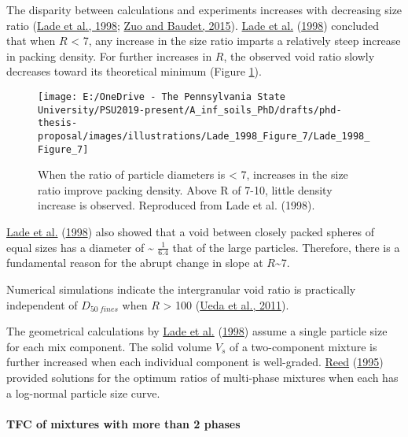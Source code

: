 \documentclass[
  letterpaper,
  openany]{book}
\begin{document}
The disparity between calculations and experiments increases with decreasing size ratio (\protect\hyperlink{ref-Lade1998}{Lade et al., 1998}; \protect\hyperlink{ref-Zuo2015}{Zuo and Baudet, 2015}).
\protect\hyperlink{ref-Lade1998}{Lade et al.} (\protect\hyperlink{ref-Lade1998}{1998}) concluded that when \(R\) \textless{} 7, any increase in the size ratio imparts a relatively steep increase in packing density.
For further increases in \(R\), the observed void ratio slowly decreases toward its theoretical minimum (Figure \ref{fig:lade-1998-figure-7}).

\begin{figure}

{\centering \texttt{[image: E:/OneDrive - The Pennsylvania State University/PSU2019-present/A\_inf\_soils\_PhD/drafts/phd-thesis-proposal/images/illustrations/Lade\_1998\_Figure\_7/Lade\_1998\_Figure\_7]} 

}

\caption[Importance of particle diameter ratio for intergranular packing]{When the ratio of particle diameters is < 7, increases in the size ratio improve packing density. Above R of 7-10, little density increase is observed. Reproduced from Lade et al. (1998).}\label{fig:lade-1998-figure-7}
\end{figure}

\protect\hyperlink{ref-Lade1998}{Lade et al.} (\protect\hyperlink{ref-Lade1998}{1998}) also showed that a void between closely packed spheres of equal sizes has a diameter of \textasciitilde{} \(\frac{1}{6.4}\) that of the large particles.
Therefore, there is a fundamental reason for the abrupt change in slope at \(R\)\textasciitilde7.

Numerical simulations indicate the intergranular void ratio is practically independent of \(D_{50~fines}\) when \(R\) \textgreater{} 100 (\protect\hyperlink{ref-Ueda2011}{Ueda et al., 2011}).

The geometrical calculations by \protect\hyperlink{ref-Lade1998}{Lade et al.} (\protect\hyperlink{ref-Lade1998}{1998}) assume a single particle size for each mix component.
The solid volume \(V_s\) of a two-component mixture is further increased when each individual component is well-graded.
\protect\hyperlink{ref-Reed1995}{Reed} (\protect\hyperlink{ref-Reed1995}{1995}) provided solutions for the optimum ratios of multi-phase mixtures when each has a log-normal particle size curve.

\hypertarget{tfc-of-mixtures-with-more-than-2-phases}{%
\paragraph{TFC of mixtures with more than 2 phases}\label{tfc-of-mixtures-with-more-than-2-phases}}
\end{document}
